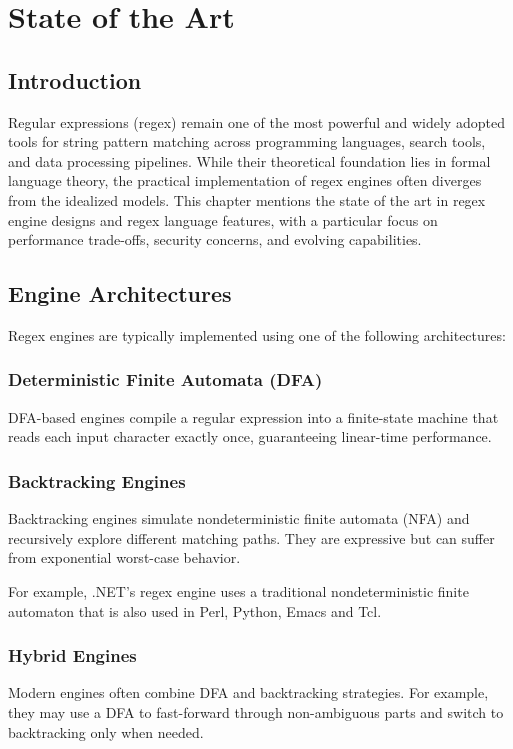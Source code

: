\chapter{State of the Art}\label{chap:art}

\section{Introduction}
Regular expressions (regex) remain one of the most powerful and widely adopted tools for string pattern matching across programming languages, search tools, and data processing pipelines. While their theoretical foundation lies in formal language theory, the practical implementation of regex engines often diverges from the idealized models. This chapter mentions the state of the art in regex engine designs and regex language features, with a particular focus on performance trade-offs, security concerns, and evolving capabilities.

\section{Engine Architectures}
Regex engines are typically implemented using one of the following architectures:

\subsection{Deterministic Finite Automata (DFA)}
DFA-based engines compile a regular expression into a finite-state machine that reads each input character exactly once, guaranteeing linear-time performance. 

\subsection{Backtracking Engines}
Backtracking engines simulate nondeterministic finite automata (NFA) and recursively explore different matching paths. They are expressive but can suffer from exponential worst-case behavior.

For example, .NET's regex engine uses a traditional nondeterministic finite automaton that is also used in Perl, Python, Emacs and Tcl.


\subsection{Hybrid Engines}
Modern engines often combine DFA and backtracking strategies. For example, they may use a DFA to fast-forward through non-ambiguous parts and switch to backtracking only when needed.

